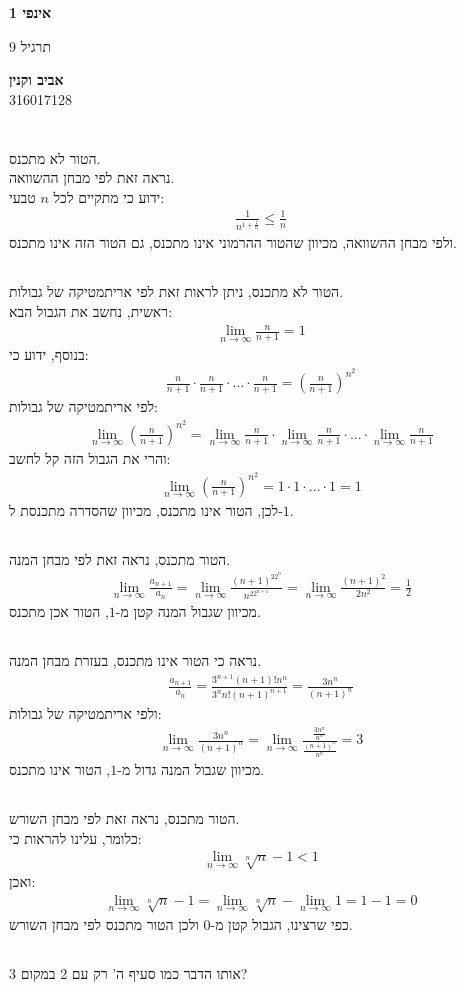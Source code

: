 \documentclass[a4paper, 12pt, leqno]{article}
\newcommand{\sub}[1]{\subsection{\underline{#1}}}
\newcommand{\eq}[1]{\begin{align*}#1\end{align*}}
\newcommand{\limn}{\lim_{n\to\infty}}
\renewcommand{\leq}{\leqslant}
\begin{document}
\begin{titlepage}
    \begin{center}
        \vspace*{4cm}
    
        {\fontsize{32pt}{32pt}\selectfont \textbf{אינפי 1}}
        
        \vspace{0.4cm}
        
        {\LARGE
        תרגיל 9}
    
        \vfill
            
        {
            \Large\textbf{אביב וקנין}
            \\
            316017128
        }
    \end{center}
\end{titlepage}

\section{}
\sub{}
הטור לא מתכנס.\\
נראה זאת לפי מבחן ההשוואה.\\
ידוע כי מתקיים לכל $n$ טבעי:
\eq{
    \frac{1}{n^{1+\frac{1}{n}}}\leq\frac{1}{n}
}
ולפי מבחן ההשוואה, מכיוון שהטור ההרמוני אינו מתכנס, גם הטור הזה אינו מתכנס.
\sub{}
הטור לא מתכנס, ניתן לראות זאת לפי אריתמטיקה של גבולות.\\
ראשית, נחשב את הגבול הבא:
\eq{
    \limn{\frac{n}{n+1}}=1
}
בנוסף, ידוע כי:
\eq{
    \frac{n}{n+1}\cdot\frac{n}{n+1}\cdot...\cdot\frac{n}{n+1}=(\frac{n}{n+1})^{n^2}
}
לפי אריתמטיקה של גבולות:
\eq{
    \limn{(\frac{n}{n+1})^{n^2}}=\limn{\frac{n}{n+1}}\cdot\limn{\frac{n}{n+1}}\cdot...\cdot\limn{\frac{n}{n+1}}
}
והרי את הגבול הזה קל לחשב:
\eq{
    \limn{(\frac{n}{n+1})^{n^2}}=1\cdot1\cdot...\cdot1=1
}
לכן, הטור אינו מתכנס, מכיוון שהסדרה מתכנסת ל-$1$.
\setcounter{subsection}{3}
\sub{}
הטור מתכנס, נראה זאת לפי מבחן המנה.
\eq{
    \limn{\frac{a_{n+1}}{a_n}}=\limn{\frac{(n+1)^22^n}{n^22^{n+1}}}=\limn\frac{(n+1)^2}{2n^2}=\frac{1}{2}
}
מכיוון שגבול המנה קטן מ-$1$, הטור אכן מתכנס.
\sub{}
נראה כי הטור אינו מתכנס, בעזרת מבחן המנה.
\eq{
    \frac{a_{n+1}}{a_n}=\frac{3^{n+1}(n+1)!n^n}{3^nn!(n+1)^{n+1}}=\frac{3n^n}{(n+1)^n}
}
ולפי אריתמטיקה של גבולות:
\eq{
    \limn\frac{3n^n}{(n+1)^n}=\limn\frac{\frac{3n^n}{n^n}}{\frac{(n+1)^n}{n^n}}=3
}
מכיוון שגבול המנה גדול מ-$1$, הטור אינו מתכנס.
\setcounter{subsection}{6}
\sub{}
הטור מתכנס, נראה זאת לפי מבחן השורש.\\
כלומר, עלינו להראות כי:
\eq{
    \limn{\sqrt[n]{n}-1}<1
}
ואכן:
\eq{
    \limn{\sqrt[n]{n}-1}=\limn\sqrt[n]{n}-\limn1=1-1=0
}
כפי שרצינו, הגבול קטן מ-$0$ ולכן הטור מתכנס לפי מבחן השורש.
\sub{}
אותו הדבר כמו סעיף ה' רק עם 2 במקום 3?
\pagebreak
\end{document}
